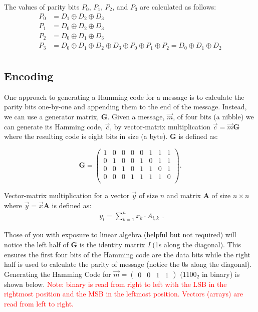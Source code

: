 \documentclass[11pt]{article}
\begin{document}
\noindent The values of parity bits $P_0$, $P_1$, $P_2$, and $P_3$ are
calculated as follows:
\begin{equation*}
\begin{split}
    P_0 &= D_1 \oplus D_2 \oplus D_3 \\
    P_1 &= D_0 \oplus D_2 \oplus D_3 \\
    P_2 &= D_0 \oplus D_1 \oplus D_3 \\
    P_3 &= D_0 \oplus D_1 \oplus D_2 \oplus D_3 \oplus P_0 \oplus P_1
    \oplus P_2 = D_0 \oplus D_1 \oplus D_2 \\
\end{split}
\end{equation*}

\subsection{Encoding}

One approach to generating a Hamming code for a message is to calculate
the parity bits one-by-one and appending them to the end of the message.
Instead, we can use a generator matrix, $\boldsymbol{G}$.  Given a
message, $\Vec{m}$, of four bits (a nibble) we can generate its Hamming
code, $\Vec{c}$, by vector-matrix multiplication $\Vec{c} =
\Vec{m}\boldsymbol{G}$ where the resulting code is eight bits in size (a
byte). $\boldsymbol{G}$ is defined as:

\begin{equation*}
  \boldsymbol{G} =
  \begin{pmatrix}
    1 & 0 & 0 & 0 & 0 & 1 & 1 & 1 \\
    0 & 1 & 0 & 0 & 1 & 0 & 1 & 1 \\
    0 & 0 & 1 & 0 & 1 & 1 & 0 & 1 \\
    0 & 0 & 0 & 1 & 1 & 1 & 1 & 0 \\
  \end{pmatrix}.
\end{equation*}

\noindent Vector-matrix multiplication for a vector $\Vec{y}$ of size
$n$ and matrix $\boldsymbol{A}$ of size $n \times n$ where $\Vec{y} =
\Vec{x}\boldsymbol{A}$ is defined as:
\begin{equation*}
  \begin{split}
    y_{i} = \sum\limits_{k=1}^n x_k \cdot A_{i,k}
  \end{split}.
\end{equation*}

Those of you with exposure to linear algebra (helpful but not required)
will notice the left half of $\boldsymbol{G}$ is the identity matrix
\textit{I} (1s along the diagonal). This ensures the first four bits of
the Hamming code are the data bits while the right half is used to
calculate the parity of message (notice the 0s along the diagonal).
Generating the Hamming Code for $\Vec{m} = \begin{pmatrix} 0 & 0 & 1 & 1
\end{pmatrix}$ ($1100_2$ in binary) is shown below.
\textcolor{red}{Note: binary is read from right to left with the LSB in
the rightmost position and the MSB in the leftmost position. Vectors
(arrays) are read from left to right.}
\end{document}
